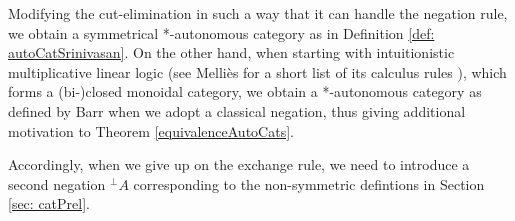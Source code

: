 \documentclass[DIN, pagenumber=false, fontsize=11pt, parskip=half, colorinlistoftodos, svgnames]{scrartcl}
\begin{document}
	
	\begin{remark}
		Modifying the cut-elimination in such a way  that it can handle the negation rule, we obtain a symmetrical *-autonomous category as in Definition \ref{def: autoCatSrinivasan}. 
		On the other hand, when starting with intuitionistic multiplicative linear logic (see Melliès for a short list of its calculus rules \cite[p43, fig. 2]{mellies}), which forms a (bi-)closed monoidal category, we obtain a *-autonomous category as defined by Barr \cite{barr95, barr91} when we adopt a classical negation, thus giving additional motivation to Theorem \ref{equivalenceAutoCats}.
		
		Accordingly, when we give up on the exchange rule, we need to introduce a second negation ${^\bot A}$ corresponding to the non-symmetric defintions in Section \ref{sec: catPrel}.
	\end{remark}
	
	
	
	
	
	
	
	
	
	
	
	
	
	
	
 	\printbibliography
	
	
\end{document}
